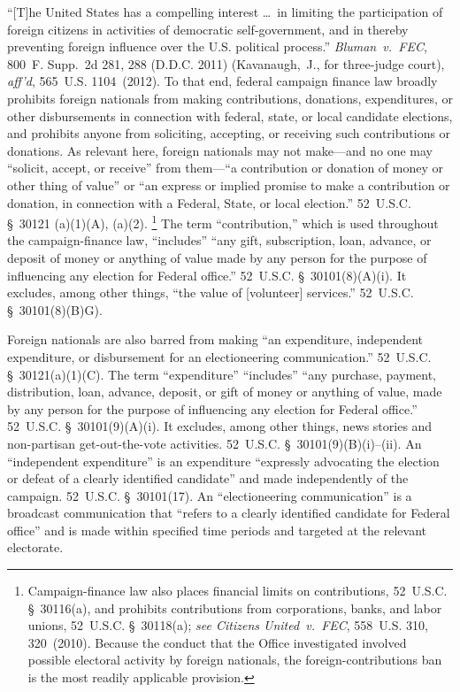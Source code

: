 ``[T]he United States has a compelling interest \dots\ in limiting the participation of foreign citizens in activities of democratic self-government, and in thereby preventing foreign influence over the U.S. political process.''
\textit{Bluman~v.\ FEC}, 800~F. Supp.~2d 281, 288 (D.D.C. 2011) (Kavanaugh,~J., for three-judge court), \textit{aff'd}, 565~U.S. 1104~(2012).
To that end, federal campaign finance law broadly prohibits foreign nationals from making contributions, donations, expenditures, or other disbursements in connection with federal, state, or local candidate elections, and prohibits anyone from soliciting, accepting, or receiving such contributions or donations.
As relevant here, foreign nationals may not make---and no one may ``solicit, accept, or receive'' from them---``a contribution or donation of money or other thing of value'' or ``an express or implied promise to make a contribution or donation, in connection with a Federal, State, or local election.''
52~U.S.C. \S~30121 (a)(1)(A), (a)(2).%
\footnote{Campaign-finance law also places financial limits on contributions, 52~U.S.C. \S~30116(a), and prohibits contributions from corporations, banks, and labor unions, 52~U.S.C. \S~30118(a);
\textit{see Citizens United~v.\ FEC}, 558~U.S. 310, 320~(2010).
Because the conduct that the Office investigated involved possible electoral activity by foreign nationals, the foreign-contributions ban is the most readily applicable provision.}
The term ``contribution,'' which is used throughout the campaign-finance law, ``includes'' ``any gift, subscription, loan, advance, or deposit of money or anything of value made by any person for the purpose of influencing any election for Federal office.''
52~U.S.C. \S~30101(8)(A)(i).
It excludes, among other things, ``the value of [volunteer] services.'' 52~U.S.C. \S~30101(8)(B)G).

Foreign nationals are also barred from making ``an expenditure, independent expenditure, or disbursement for an electioneering communication.''
52~U.S.C. \S~30121(a)(1)(C).
The term ``expenditure'' ``includes'' ``any purchase, payment, distribution, loan, advance, deposit, or gift of money or anything of value, made by any person for the purpose of influencing any election for Federal office.''
52~U.S.C. \S~30101(9)(A)(i).
It excludes, among other things, news stories and non-partisan get-out-the-vote activities.
52~U.S.C. \S~30101(9)(B)(i)--(ii).
An ``independent expenditure'' is an expenditure ``expressly advocating the election or defeat of a clearly identified candidate'' and made independently of the campaign.
52~U.S.C. \S~30101(17).
An ``electioneering communication'' is a broadcast communication that ``refers to a clearly identified candidate for Federal office'' and is made within specified time periods and targeted at the relevant electorate.

